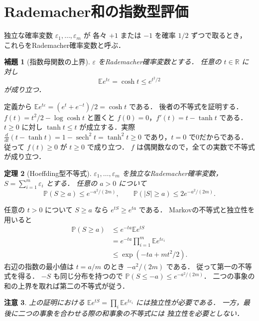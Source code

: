 \documentclass[a5paper,10pt,onecolumn]{jsarticle}
\makeatletter
\theoremstyle{mathnotetheorem}
\newtheorem{theorem}{定理}[section]
\newtheorem{lemma}[theorem]{補題}
\newtheorem{remark}[theorem]{注意}
\renewcommand{\proofname}{証明}
\renewenvironment{proof}[1][\proofname]{%
  \par\pushQED{\qed}\normalfont\topsep4\p@\@plus2\p@\relax
  \trivlist\item[\hskip\labelsep\bfseries #1]\ignorespaces
}{\popQED\endtrivlist\@endpefalse}
\makeatother
\begin{document}
\section{Rademacher和の指数型評価}
独立な確率変数 $\varepsilon_1,\ldots,\varepsilon_m$ が
各々 $+1$ または $-1$ を確率 $1/2$ ずつで取るとき，
これらをRademacher確率変数と呼ぶ．

\begin{lemma}[指数母関数の上界]\label{lem:cosh}
$\varepsilon$ をRademacher確率変数とする．
任意の $t\in\mathbb R$ に対し
\[
 \mathbb E e^{t\varepsilon}
 =\cosh t\le e^{t^2/2}
\]
が成り立つ．
\end{lemma}
\begin{proof}
定義から
$\mathbb Ee^{t\varepsilon}=(e^t+e^{-t})/2=\cosh t$ である．
後者の不等式を証明する．
$f(t)=t^2/2-\log\cosh t$ と置くと
$f(0)=0$，$f'(t)=t-\tanh t$ である．
$t\ge0$ に対し
$\tanh t\le t$ が成立する．実際
$\frac{d}{dt}(t-\tanh t)=1-\operatorname{sech}^2t
 =\tanh^2t\ge0$ であり，$t=0$ で0だからである．
従って $f(t)\ge0$ が $t\ge0$ で成り立つ．
$f$ は偶関数なので，全ての実数で不等式が成り立つ．
\end{proof}

\begin{theorem}[Hoeffding型不等式]\label{thm:hoeffding}
$\varepsilon_1,\ldots,\varepsilon_m$ を独立なRademacher確率変数，
$S=\sum_{i=1}^m\varepsilon_i$ とする．
任意の $a>0$ について
\begin{equation}\label{eq:hoeffding}
 \mathbb P(S\ge a)\le e^{-a^2/(2m)},
 \qquad
 \mathbb P(|S|\ge a)\le2e^{-a^2/(2m)}.
\end{equation}
\end{theorem}
\begin{proof}
任意の $t>0$ について
$S\ge a$ なら $e^{tS}\ge e^{ta}$ である．
Markovの不等式と独立性を用いると
\[
 \begin{aligned}
 \mathbb P(S\ge a)
 &\le e^{-ta}\mathbb Ee^{tS}\\
 &=e^{-ta}\prod_{i=1}^m\mathbb Ee^{t\varepsilon_i}\\
 &\le\exp(-ta+mt^2/2).
 \end{aligned}
\]
右辺の指数の最小値は $t=a/m$ のとき $-a^2/(2m)$ である．
従って第一の不等式を得る．
$-S$ も同じ分布を持つので
$\mathbb P(S\le-a)\le e^{-a^2/(2m)}$．
二つの事象の和の上界を取れば第二の不等式が従う．
\end{proof}

\begin{remark}
上の証明における $\mathbb Ee^{tS}=\prod_i\mathbb Ee^{t\varepsilon_i}$
には独立性が必要である．
一方，最後に二つの事象を合わせる際の和事象の不等式には
独立性を必要としない．
\end{remark}
\end{document}
